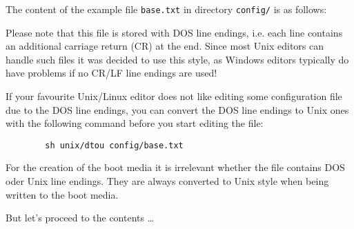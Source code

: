 

The content of the example file \verb+base.txt+ in directory \verb+config/+
is as follows:

\begin{example}
\end{example}

\medskip

Please note that this file is stored with DOS line endings, i.e. each line
contains an additional carriage return (CR) at the end. Since most Unix editors
can handle such files it was decided to use this style, as Windows editors typically 
do have problems if no CR/LF line endings are used!

If your favourite Unix/Linux editor does not like editing some configuration
file due to the DOS line endings, you can convert the DOS line endings to Unix
ones with the following command before you start editing the file:

\begin{example}
\begin{verbatim}
        sh unix/dtou config/base.txt
\end{verbatim}
\end{example}

For the creation of the boot media it is irrelevant whether the file contains
DOS oder Unix line endings. They are always converted to Unix style when
being written to the boot media.

But let's proceed to the contents \ldots
